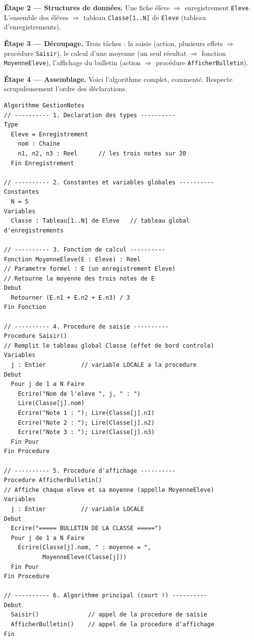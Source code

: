 \documentclass[11pt]{article}
\begin{document}
\textbf{Étape 2 — Structures de données.} Une fiche élève $\Rightarrow$ enregistrement \texttt{Eleve}. L'ensemble des élèves $\Rightarrow$ tableau \texttt{Classe[1..N]} de \texttt{Eleve} (tableau d'enregistrements).

\textbf{Étape 3 — Découpage.} Trois tâches : la saisie (action, plusieurs effets $\Rightarrow$ procédure \texttt{Saisir}), le calcul d'une moyenne (un seul résultat $\Rightarrow$ fonction \texttt{MoyenneEleve}), l'affichage du bulletin (action $\Rightarrow$ procédure \texttt{AfficherBulletin}).

\textbf{Étape 4 — Assemblage.} Voici l'algorithme complet, commenté. Respecte scrupuleusement l'ordre des déclarations.

\begin{exemplebox}
\begin{lstlisting}
Algorithme GestionNotes
// ---------- 1. Declaration des types ----------
Type
  Eleve = Enregistrement
    nom : Chaine
    n1, n2, n3 : Reel      // les trois notes sur 20
  Fin Enregistrement

// ---------- 2. Constantes et variables globales ----------
Constantes
  N = 5
Variables
  Classe : Tableau[1..N] de Eleve   // tableau global d'enregistrements

// ---------- 3. Fonction de calcul ----------
Fonction MoyenneEleve(E : Eleve) : Reel
// Parametre formel : E (un enregistrement Eleve)
// Retourne la moyenne des trois notes de E
Debut
  Retourner (E.n1 + E.n2 + E.n3) / 3
Fin Fonction

// ---------- 4. Procedure de saisie ----------
Procedure Saisir()
// Remplit le tableau global Classe (effet de bord controle)
Variables
  j : Entier          // variable LOCALE a la procedure
Debut
  Pour j de 1 a N Faire
    Ecrire("Nom de l'eleve ", j, " : ")
    Lire(Classe[j].nom)
    Ecrire("Note 1 : "); Lire(Classe[j].n1)
    Ecrire("Note 2 : "); Lire(Classe[j].n2)
    Ecrire("Note 3 : "); Lire(Classe[j].n3)
  Fin Pour
Fin Procedure

// ---------- 5. Procedure d'affichage ----------
Procedure AfficherBulletin()
// Affiche chaque eleve et sa moyenne (appelle MoyenneEleve)
Variables
  j : Entier          // variable LOCALE
Debut
  Ecrire("===== BULLETIN DE LA CLASSE =====")
  Pour j de 1 a N Faire
    Ecrire(Classe[j].nom, " : moyenne = ",
           MoyenneEleve(Classe[j]))
  Fin Pour
Fin Procedure

// ---------- 6. Algorithme principal (court !) ----------
Debut
  Saisir()              // appel de la procedure de saisie
  AfficherBulletin()    // appel de la procedure d'affichage
Fin
\end{lstlisting}
\end{exemplebox}
\end{document}
